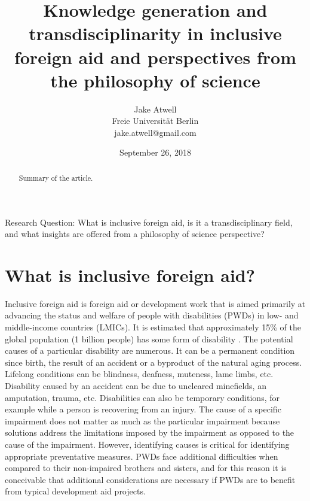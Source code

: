 \documentclass[a4paper]{article}
\begin{document}
\title{Knowledge generation and transdisciplinarity in inclusive foreign aid
and perspectives from the philosophy of science}
\author{Jake Atwell\\
    Freie Universität Berlin\\
    jake.atwell@gmail.com
}
\date{September 26, 2018}

\maketitle



\begin{abstract}
Summary of the article.
\end{abstract}
\newpage

\noindent Research Question: What is inclusive foreign aid, is it a
transdisciplinary field, and what insights are offered from a philosophy of
science perspective?

\tableofcontents

\newpage
{} %




\section{What is inclusive foreign aid?}

Inclusive foreign aid is foreign aid or development work that is aimed
primarily at advancing the status and welfare of people with disabilities
(PWDs) in low- and middle-income countries (LMICs). It is estimated that
approximately 15\% of the global population (1 billion people) has some form
of disability \citep{banks2017poverty}. The potential causes of a particular
disability are numerous. It can be a permanent condition since birth, the
result of an accident or a byproduct of the natural aging process. Lifelong
conditions can be blindness, deafness, muteness, lame limbs, etc. Disability
caused by an accident can be due to uncleared minefields, an amputation,
trauma, etc. Disabilities can also be temporary conditions, for example while
a person is recovering from an injury. The cause of a specific impairment does
not matter as much as the particular impairment because solutions address the
limitations imposed by the impairment as opposed to the cause of the
impairment. However, identifying causes is critical for identifying
appropriate preventative measures. PWDs face additional difficulties when
compared to their non-impaired brothers and sisters, and for this reason it is
conceivable that additional considerations are necessary if PWDs are to
benefit from typical development aid projects.
\end{document}
